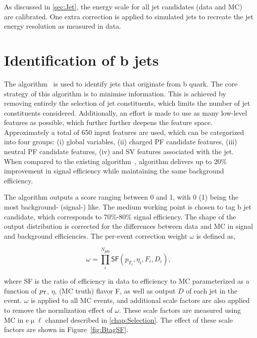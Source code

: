 As discussed in \autoref{sec:Jet}, the energy scale for all jet candidates (data and \ac{MC}) are calibrated. One extra correction is applied to simulated jets to recreate the jet energy resolution as measured in data. 
\section{Identification of b jets}
\label{sec:Btag}

The \DeepJ algorithm~\cite{Bols:2020bkb} is used to identify jets that originate from b quark. The core strategy of this algorithm is to minimise information. This is achieved by removing entirely the selection of jet constituents, which limits the number of jet constituents considered.  Additionally, an effort is made to use as many low-level features as possible, which further further deepens the feature space. Approximately a total of 650 input features are used,  which can be categorized into four groups: (i) global variables, (ii) charged PF candidate features, (iii) neutral PF candidate features, (iv) and \ac{SV} features associated with the jet. When compared to the existing \DeepC algorithm~\cite{CMS:2017wtu}, \DeepJ algorithm delivers up to 20\% improvement in signal efficiency while maintaining the same background efficiency.

The \DeepJ algorithm outputs a score ranging between 0 and 1, with 0 (1) being the most background- (signal-) like. The medium working point is chosen to tag b jet candidate, which corresponds to 70\%-80\% signal efficiency. The shape of the \DeepJ output distribution is corrected for the differences between data and \ac{MC} in signal and background efficiencies. The per-event correction weight $ \omega$ is defined as,
 
 \begin{equation}
 \omega = \prod_{i}^{N_{\textsf{jets}}} \textsf{SF}(p_{T_{i}},\eta_i, F_i, D_i),
 \end{equation}
 
where \textsf{SF} is the ratio of efficiency in data to efficiency to \ac{MC} parameterized as a function of $p_{\textsf{T}}$, $\eta$, (MC truth) flavor F, as well as \DeepJ output $D$ of each jet in the event. $\omega$ is applied to all \ac{MC} events, and additional scale factors are also applied to remove the normlization effect of $\omega$. These scale factors are measured using \ac{MC} in e$\upmu\ell$ channel described in \autoref{chap:Selection}. The effect of these scale factors are shown in Figure~\ref{fig:BtagSF}.
 
